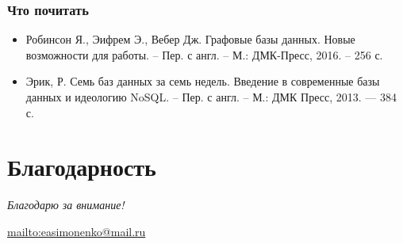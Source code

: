 \documentclass[11pt]{beamer}
\begin{document}
\begin{frame}
  \frametitle{Что почитать}
  \begin{itemize}
  \item Робинсон Я., Эифрем Э., Вебер Дж. Графовые базы данных. Новые возможности
    для работы. -- Пер. с англ. -- М.: ДМК-Пресс, 2016. -- 256 с.
  \item Эрик, Р. Семь баз данных за семь недель. Введение в современные базы данных
    и идеологию NoSQL. -- Пер. с англ. -- М.: ДМК Пресс, 2013. — 384 с.
  \end{itemize}
\end{frame}

\section*{Благодарность}

\begin{frame}
  \center
  \textit{Благодарю за внимание!}
  
  \textbf{\textsl{\inserttitle}}

  \insertauthor

  \url{mailto:easimonenko@mail.ru}

  \insertinstitute
\end{frame}
\end{document}
